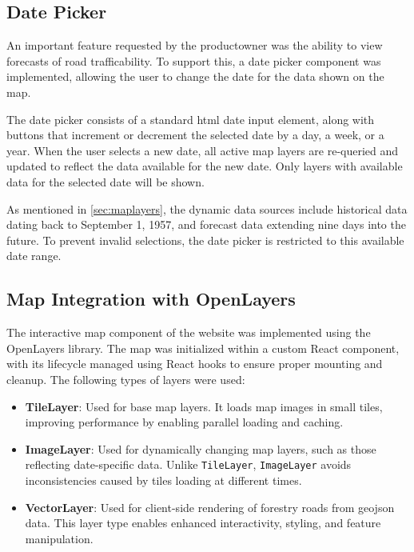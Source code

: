 \subsection{Date Picker}

An important feature requested by the \gls{productowner} was the ability to view forecasts of road trafficability. To support this, a date picker component was implemented, allowing the user to change the date for the data shown on the map.

The date picker consists of a standard \acrshort{html} date input element, along with buttons that increment or decrement the selected date by a day, a week, or a year. When the user selects a new date, all active map layers are re-queried and updated to reflect the data available for the new date. Only layers with available data for the selected date will be shown.

As mentioned in \autoref{sec:maplayers}, the dynamic data sources include historical data dating back to September 1, 1957, and forecast data extending nine days into the future. To prevent invalid selections, the date picker is restricted to this available date range.

\subsection{Map Integration with OpenLayers}

The interactive map component of the website was implemented using the OpenLayers library. The map was initialized within a custom React component, with its lifecycle managed using React hooks to ensure proper mounting and cleanup. The following types of layers were used:

\begin{itemize}
    \item \textbf{TileLayer}: Used for base map layers. It loads map images in small tiles, improving performance by enabling parallel loading and caching.
    \item \textbf{ImageLayer}: Used for dynamically changing map layers, such as those reflecting date-specific data. Unlike \texttt{TileLayer}, \texttt{ImageLayer} avoids inconsistencies caused by tiles loading at different times.
    \item \textbf{VectorLayer}: Used for client-side rendering of forestry roads from \gls{geojson} data. This layer type enables enhanced interactivity, styling, and feature manipulation.
\end{itemize}

